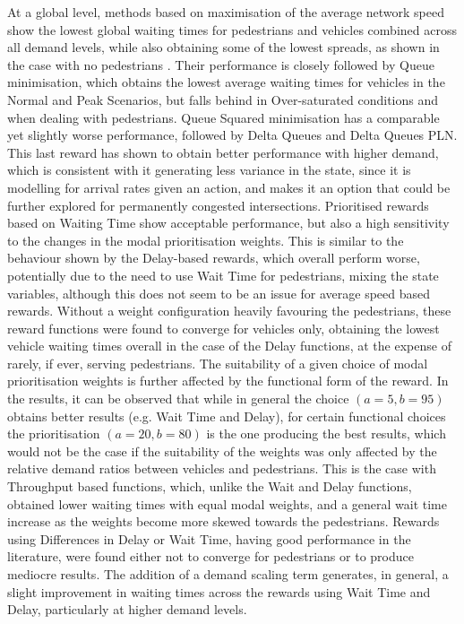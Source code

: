 \documentclass[a4paper, conference]{IEEEtran}
\begin{document}
At a global level, methods based on maximisation of the average network speed show the lowest global waiting times for pedestrians and vehicles combined across all demand levels, while also obtaining some of the lowest spreads, as shown in the case with no pedestrians \cite{previous}.
Their performance is closely followed by Queue minimisation, which obtains the lowest average waiting times for vehicles in the Normal and Peak Scenarios, but falls behind in Over-saturated conditions and when dealing with pedestrians.
Queue Squared minimisation has a comparable yet slightly worse performance, followed by Delta Queues and Delta Queues PLN.
This last reward has shown to obtain better performance with higher demand, which is consistent with it generating less variance in the state, since it is modelling for arrival rates given an action, and makes it an option that could be further explored for permanently congested intersections.
Prioritised rewards based on Waiting Time show acceptable performance, but also a high sensitivity to the changes in the modal prioritisation weights. 
This is similar to the behaviour shown by the Delay-based rewards, which overall perform worse, potentially due to the need to use Wait Time for pedestrians, mixing the state variables, although this does not seem to be an issue for average speed based rewards.
Without a weight configuration heavily favouring the pedestrians, these reward functions were found to converge for vehicles only, obtaining the lowest vehicle waiting times overall in the case of the Delay functions, at the expense of rarely, if ever, serving pedestrians.
The suitability of a given choice of modal prioritisation weights is further affected by the functional form of the reward.
In the results, it can be observed that while in general the choice $(a=5,b=95)$ obtains better results (e.g. Wait Time and Delay), for certain functional choices the prioritisation $(a=20,b=80)$ is the one producing the best results, which would not be the case if the suitability of the weights was only affected by the relative demand ratios between vehicles and pedestrians. 
This is the case with Throughput based functions, which, unlike the Wait and Delay functions, obtained lower waiting times with equal modal weights, and a general wait time increase as the weights become more skewed towards the pedestrians.
Rewards using Differences in Delay or Wait Time, having good performance in the literature, were found either not to converge for pedestrians or to produce mediocre results.
The addition of a demand scaling term generates, in general, a slight improvement in waiting times across the rewards using Wait Time and Delay, particularly at higher demand levels. 
\end{document}
